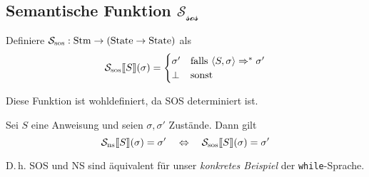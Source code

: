 \subsection{Semantische Funktion $\mathcal{S_{\text{sos}}}$}

\begin{definition}
    Definiere $\mathcal{S_{\text{sos}}}: \operatorname{Stm} \to (\operatorname{State} \to \operatorname{State})$ als
    \[
        \mathcal{S_{\text{sos}}}\mathrm{[}\kern-.14em\mathrm{[} S \mathrm{]}\kern-.14em\mathrm{]}(\sigma) = \begin{cases}
            \sigma' & \text{falls } \langle S, \sigma \rangle \Rightarrow^* \sigma' \\
            \bot & \text{sonst}
        \end{cases}
    \]

    Diese Funktion ist wohldefiniert, da SOS determiniert ist.
\end{definition}

\begin{theorem}
    Sei $S$ eine Anweisung und seien $\sigma, \sigma'$ Zustände. Dann gilt
    \[
        \mathcal{S_{\text{ns}}}\mathrm{[}\kern-.14em\mathrm{[} S \mathrm{]}\kern-.14em\mathrm{]}(\sigma) = \sigma'
        \quad\Leftrightarrow\quad
        \mathcal{S_{\text{sos}}}\mathrm{[}\kern-.14em\mathrm{[} S \mathrm{]}\kern-.14em\mathrm{]}(\sigma) = \sigma'
    \]

    D.\,h. SOS und NS sind äquivalent für unser \emph{konkretes Beispiel} der \texttt{while}-Sprache.
\end{theorem}

